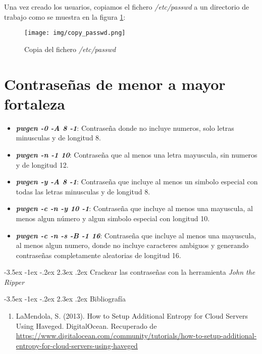 \documentclass[11pt]{report}
\makeatletter
\renewcommand\chapter{\@startsection{chapter}{0}{\z@}%
    {-3.5ex \@plus -1ex \@minus -.2ex}%
    {2.3ex \@plus.2ex}%
    {\normalfont\Large\bfseries}}
\makeatother
\begin{document}
Una vez creado los usuarios, copiamos el fichero \emph{/etc/passwd} a un directorio de trabajo como se muestra en la figura \ref{fig:copia del fichero /etc/passwd}:
\begin{figure}[H]
  \centering
  \texttt{[image: img/copy\_passwd.png]}
  \caption{Copia del fichero \emph{/etc/passwd}}
  \label{fig:copia del fichero /etc/passwd}
\end{figure}

\section{Contraseñas de menor a mayor fortaleza}
\begin{itemize}
  \item \textbf{\emph{pwgen -0 -A 8 -1}}: Contraseña donde no incluye numeros, solo letras minusculas y de longitud 8.
  \item \textbf{\emph{pwgen -n -1 10}}: Contraseña que al menos una letra mayuscula, sin numeros y de longitud 12.
  \item \textbf{\emph{pwgen -y -A 8 -1}}: Contraseña que incluye al menos un simbolo especial con todas las letras minusculas y de longitud 8.
  \item \textbf{\emph{pwgen -c -n -y 10 -1}}: Contraseña que incluye al menos una mayuscula, al menos algun número y algun simbolo especial con longitud 10.
  \item \textbf{\emph{pwgen -c -n -s -B -1 16}}: Contraseña que incluye al menos una mayuscula, al menos algun numero, donde no incluye caracteres ambiguos y 
  generando contraseñas completamente aleatorias de longitud 16.
\end{itemize}

\cleardoublepage

\chapter{Crackear las contraseñas con la herramienta \emph{John the Ripper}}


\cleardoublepage

\chapter{Bibliografía} %
\begin{enumerate}
\item LaMendola, S. (2013). How to Setup Additional Entropy for Cloud Servers Using Haveged. DigitalOcean. Recuperado de \url{https://www.digitalocean.com/community/tutorials/how-to-setup-additional-entropy-for-cloud-servers-using-haveged}

\end{enumerate}
\end{document}
